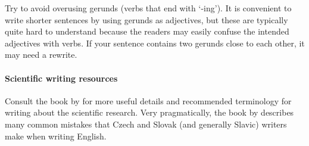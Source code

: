 Try to avoid overusing gerunds (verbs that end with `-ing'). It is convenient to write shorter sentences by using gerunds as adjectives, but these are typically quite hard to understand because the readers may easily confuse the intended adjectives with verbs. If your sentence contains two gerunds close to each other, it may need a rewrite.

\paragraph{Scientific writing resources}
Consult the book by \citet{glasman2010science} for more useful details and recommended terminology for writing about the scientific research. Very pragmatically, the book by \citet{sparling1989english} describes many common mistakes that Czech and Slovak (and generally Slavic) writers make when writing English.
